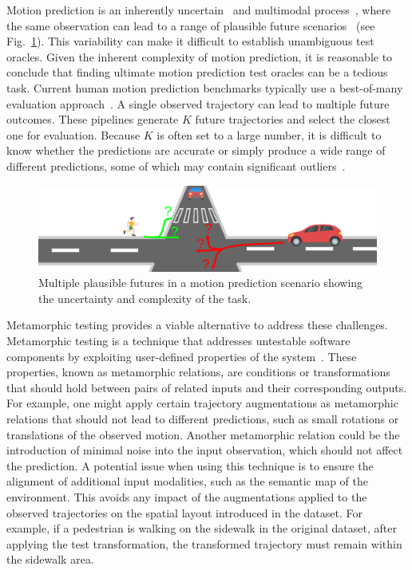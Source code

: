 \documentclass{article}
\begin{document}
Motion prediction is an inherently uncertain~\cite{li2024} and multimodal process~\cite{amirian19}, where the same observation can lead to a range of plausible future scenarios~\cite{almeida23} (see Fig.~\ref{fig:plausible_futures}).
This variability can make it difficult to establish unambiguous test oracles. Given the inherent complexity of motion prediction, it is reasonable to conclude that finding ultimate motion prediction test oracles can be a tedious task. Current human motion prediction benchmarks typically use a best-of-many evaluation approach~\cite{Kothari2020HumanTF}. A single observed trajectory can lead to multiple future outcomes. These pipelines generate $K$ future trajectories and select the closest one for evaluation. Because $K$ is often set to a large number, it is difficult to know whether the predictions are accurate or simply produce a wide range of different predictions, some of which may contain significant outliers~\cite{almeida23}.

\begin{figure}
    \centering
    \includegraphics[width=\linewidth]{plausible.png}
    \caption{Multiple plausible futures in a motion prediction scenario showing the uncertainty and complexity of the task.}
    \label{fig:plausible_futures}
\end{figure}


Metamorphic testing provides a viable alternative to address these challenges. Metamorphic testing is a technique that addresses untestable software components by exploiting user-defined properties of the system~\cite{segura16}. These properties, known as metamorphic relations, are conditions or transformations that should hold between pairs of related inputs and their corresponding outputs. For example, one might apply certain trajectory augmentations as metamorphic relations that should not lead to different predictions, such as small rotations or translations of the observed motion. Another metamorphic relation could be the introduction of minimal noise into the input observation, which should not affect the prediction. A potential issue when using this technique is to ensure the alignment of additional input modalities, such as the semantic map of the environment. This avoids any impact of the augmentations applied to the observed trajectories on the spatial layout introduced in the dataset. For example, if a pedestrian is walking on the sidewalk in the original dataset, after applying the test transformation, the transformed trajectory must remain within the sidewalk area.
\end{document}

